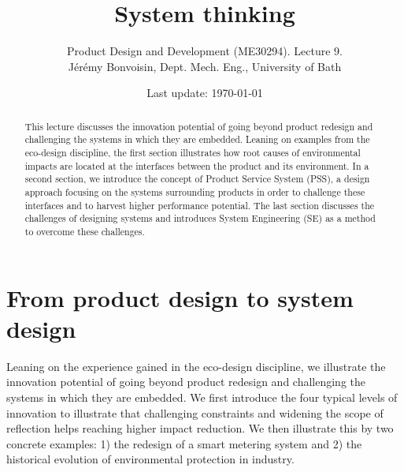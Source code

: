 \documentclass{article}
\begin{document}
\title{System thinking}

\author{Product Design and Development (ME30294). Lecture 9. \\ Jérémy Bonvoisin, Dept. Mech. Eng., University of Bath}
\date{Last update: \today}

\maketitle

\begin{abstract}
This lecture discusses the innovation potential of going beyond product redesign and challenging the systems in which they are embedded. Leaning on examples from the eco-design discipline, the first section illustrates how root causes of environmental impacts are located at the interfaces between the product and its environment. In a second section, we introduce the concept of Product Service System (PSS), a design approach focusing on the systems surrounding products in order to challenge these interfaces and to harvest higher performance potential. The last section discusses the challenges of designing systems and introduces System Engineering (SE) as a method to overcome these challenges. \end{abstract}

\tableofcontents

\section{From product design to system design}
\label{sec:FromIncrementalDesignToRethinkingSystems}

Leaning on the experience gained in the eco-design discipline, we illustrate the innovation potential of going beyond product redesign and challenging the systems in which they are embedded. We first introduce the four typical levels of innovation to illustrate that challenging constraints and widening the scope of reflection helps reaching higher impact reduction. We then illustrate this by two concrete examples: 1) the redesign of a smart metering system and 2) the historical evolution of environmental protection in industry. 
\end{document}
